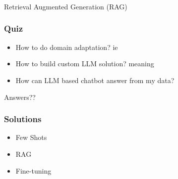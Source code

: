 \begin{frame}[fragile]\frametitle{}
\begin{center}
{\Large Retrieval Augmented Generation (RAG)}
\end{center}
\end{frame}

\begin{frame}[fragile]\frametitle{Quiz}
  \begin{itemize}
    \item How to do domain adaptation? ie
	\item How to build custom LLM solution? meaning
	\item How can LLM based chatbot answer from my data?
  \end{itemize}
  
  Answers??
  
\end{frame}

\begin{frame}[fragile]\frametitle{Solutions}
  \begin{itemize}
    \item Few Shots
	\item RAG
	\item Fine-tuning
  \end{itemize}
\end{frame}






